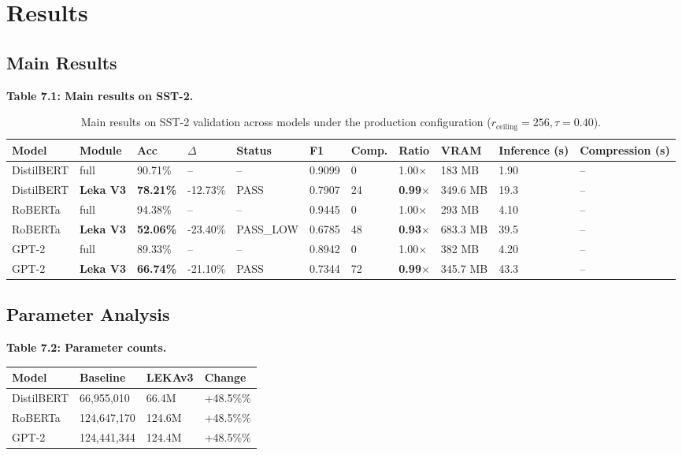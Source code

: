 \section{Results}

\subsection{Main Results}

\textbf{Table 7.1: Main results on SST-2.}

\begin{table}[t]
\centering
\small
\begin{tabular}{lllllllllll}
\toprule
\textbf{Model} & \textbf{Module} & \textbf{Acc} & \textbf{$\Delta$} & \textbf{Status} & \textbf{F1} & \textbf{Comp.} & \textbf{Ratio} & \textbf{VRAM} & \textbf{Inference (s)} & \textbf{Compression (s)} \\
\midrule
DistilBERT & full & 90.71\% & -- & -- & 0.9099 & 0 & 1.00$\times$ & 183 MB & 1.90 & -- \\
DistilBERT & \textbf{Leka V3} & \textbf{78.21\%} & -12.73\% & PASS & 0.7907 & 24 & \textbf{0.99$\times$} & 349.6 MB & 19.3 & -- \\
RoBERTa & full & 94.38\% & -- & -- & 0.9445 & 0 & 1.00$\times$ & 293 MB & 4.10 & -- \\
RoBERTa & \textbf{Leka V3} & \textbf{52.06\%} & -23.40\% & PASS\_LOW & 0.6785 & 48 & \textbf{0.93$\times$} & 683.3 MB & 39.5 & -- \\
GPT-2 & full & 89.33\% & -- & -- & 0.8942 & 0 & 1.00$\times$ & 382 MB & 4.20 & -- \\
GPT-2 & \textbf{Leka V3} & \textbf{66.74\%} & -21.10\% & PASS & 0.7344 & 72 & \textbf{0.99$\times$} & 345.7 MB & 43.3 & -- \\
\bottomrule
\end{tabular}
\caption{Main results on SST-2 validation across models under the production configuration ($r_{\mathrm{ceiling}}=256, \tau=0.40$).}
\label{tab:main_sst2}
\end{table}

\subsection{Parameter Analysis}

\textbf{Table 7.2: Parameter counts.}

\begin{table}[H]
\centering
\small
\begin{tabular}{llll}
\toprule
\textbf{Model} & \textbf{Baseline} & \textbf{LEKAv3} & \textbf{Change} \\
\midrule
DistilBERT & 66,955,010 & 66.4M & +48.5\%\% \\
RoBERTa & 124,647,170 & 124.6M & +48.5\%\% \\
GPT-2 & 124,441,344 & 124.4M & +48.5\%\% \\
\bottomrule
\end{tabular}
\end{table}


